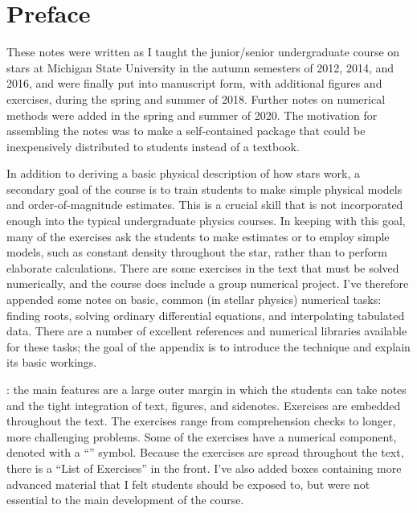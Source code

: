 
\section*{Preface}
These notes were written as I taught the junior/senior undergraduate course on stars at Michigan State University in the autumn semesters of 2012, 2014, and 2016, and were finally put into manuscript form, with additional figures and exercises, during the spring and summer of 2018. Further notes on numerical methods were added in the spring and summer of 2020. The motivation for assembling the notes was to make a self-contained package that could be inexpensively distributed to students instead of a textbook.

In addition to deriving a basic physical description of how stars work, a secondary goal of the course is to train students to make simple physical models and order-of-magnitude estimates. This is a crucial skill that is not incorporated enough into the typical undergraduate physics courses. In keeping with this goal, many of the exercises ask the students to make estimates or to employ simple models, such as constant density throughout the star, rather than to perform elaborate calculations. There are some exercises in the text that must be solved numerically, and the course does include a group numerical project. I've therefore appended some notes on basic, common (in stellar physics) numerical tasks: finding roots, solving ordinary differential equations, and interpolating tabulated data. There are a number of excellent references and numerical libraries available for these tasks; the goal of the appendix is to introduce the technique and explain its basic workings.

: the main features are a large outer margin in which the students can take notes and the tight integration of text, figures, and sidenotes. Exercises are embedded throughout the text. The exercises range from comprehension checks to longer, more challenging problems. Some of the exercises have a numerical component, denoted with a ``\notebook'' symbol. Because the exercises are spread throughout the text, there is a ``List of Exercises'' in the front. I've also added boxes containing more advanced material that I felt students should be exposed to, but were not essential to the main development of the course. 

